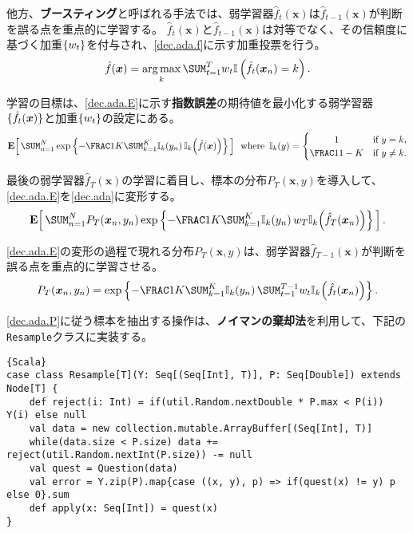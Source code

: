 \documentclass[10pt,a4paper]{book}
\begin{document}
他方、\textbf{ブースティング}と呼ばれる手法では、弱学習器$\hat{f}_t(\bm{x})$は$\hat{f}_{t-1}(\bm{x})$が判断を誤る点を重点的に学習する。
$\hat{f}_t(\bm{x})$と$\hat{f}_{t-1}(\bm{x})$は対等でなく、その信頼度に基づく加重$\seq{w_t}$を付与され、\eqref{dec.ada.f}に示す加重投票を行う。
%
\begin{equation}
\label{eq:dec.ada.f}
\hat{f}(\bm{x}) = \argmax_k \sum_{t=1}^T w_t \Ii{\hat{f}_t(\bm{x}_n)=k}.
\end{equation}

学習の目標は、\eqref{dec.ada.E}に示す\textbf{指数誤差}の期待値を最小化する弱学習器$\seq{\hat{f}_t(\bm{x})}$と加重$\seq{w_t}$の設定にある。
%
\begin{equation}
\label{eq:dec.ada.E}
\E{\sum_{n=1}^N \exp \seq{-\frac{1}{K} \sum_{k=1}^K \Ik{k}{y_n} \Ik{k}{\hat{f}(\bm{x})}}}
\where \Ik{k}{y} =
\begin{cases}
\hfill1\hfill& \text{if $y=k$},\\
\frac{1}{1-K}& \text{if $y\neq k$}.
\end{cases}
\end{equation}

最後の弱学習器$\hat{f}_T(\bm{x})$の学習に着目し、標本の分布$P_T(\bm{x},y)$を導入して、\eqref{dec.ada.E}を\eqref{dec.ada}に変形する。
%
\begin{equation}
\label{eq:dec.ada}
\E{\sum_{n=1}^N P_T(\bm{x}_n,y_n) \exp \seq{-\frac{1}{K} \sum_{k=1}^K \Ik{k}{y_n} w_T \Ik{k}{\hat{f}_T(\bm{x}_n)}}}.
\end{equation}

\eqref{dec.ada.E}の変形の過程で現れる分布$P_T(\bm{x},y)$は、弱学習器$\hat{f}_{T-1}(\bm{x})$が判断を誤る点を重点的に学習させる。
%
\begin{equation}
\label{eq:dec.ada.P}
P_T(\bm{x}_n,y_n) = \exp \seq{-\frac{1}{K} \sum_{k=1}^K \Ik{k}{y_n} \sum_{t=1}^{T-1} w_t \Ik{k}{\hat{f}_t(\bm{x}_n)}}.
\end{equation}

\eqref{dec.ada.P}に従う標本を抽出する操作は、\textbf{ノイマンの棄却法}を利用して、下記の\texttt{Resample}クラスに実装する。

\begin{Verbatim}{Scala}
case class Resample[T](Y: Seq[(Seq[Int], T)], P: Seq[Double]) extends Node[T] {
	def reject(i: Int) = if(util.Random.nextDouble * P.max < P(i)) Y(i) else null
	val data = new collection.mutable.ArrayBuffer[(Seq[Int], T)]
	while(data.size < P.size) data += reject(util.Random.nextInt(P.size)) -= null
	val quest = Question(data)
	val error = Y.zip(P).map{case ((x, y), p) => if(quest(x) != y) p else 0}.sum
	def apply(x: Seq[Int]) = quest(x)
}
\end{Verbatim}
\end{document}
